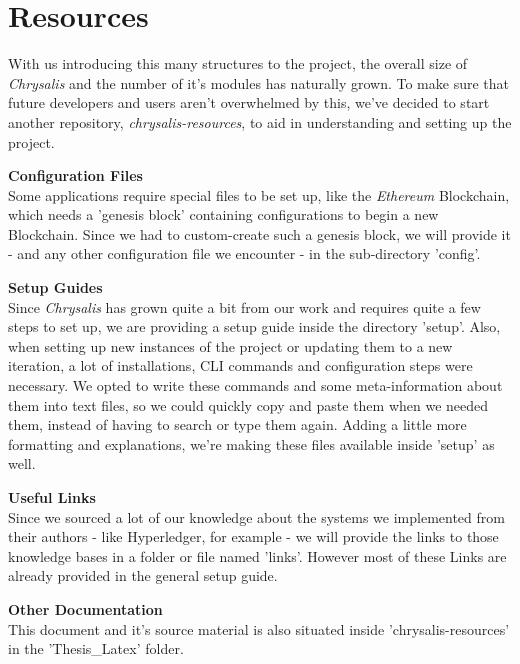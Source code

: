 %
\chapter{Resources}
\label{sec:res}

With us introducing this many structures to the project, the overall size of \emph{Chrysalis} and the number of it's modules has naturally grown. To make sure that future developers and users aren't overwhelmed by this, we've decided to start another repository, \emph{chrysalis-resources}, to aid in understanding and setting up the project.

\textbf{Configuration Files} \\[0.2em]
Some applications require special files to be set up, like the \emph{Ethereum} Blockchain, which needs a 'genesis block' containing configurations to begin a new Blockchain. Since we had to custom-create such a genesis block, we will provide it - and any other configuration file we encounter - in the sub-directory 'config'.

\textbf{Setup Guides} \\[0.2em]
Since \emph{Chrysalis} has grown quite a bit from our work and requires quite a few steps to set up, we are providing a setup guide inside the directory 'setup'. \newline
Also, when setting up new instances of the project or updating them to a new iteration, a lot of installations, CLI commands and configuration steps were necessary. We opted to write these commands and some meta-information about them into text files, so we could quickly copy and paste them when we needed them, instead of having to search or type them again. Adding a little more formatting and explanations, we're making these files available inside 'setup' as well.

\textbf{Useful Links} \\[0.2em]
Since we sourced a lot of our knowledge about the systems we implemented from their authors - like Hyperledger, for example - we will provide the links to those knowledge bases in a folder or file named 'links'. However most of these Links are already provided in the general setup guide.

\textbf{Other Documentation} \\[0.2em]
This document and it's source material is also situated inside 'chrysalis-resources' in the 'Thesis\_Latex' folder.


